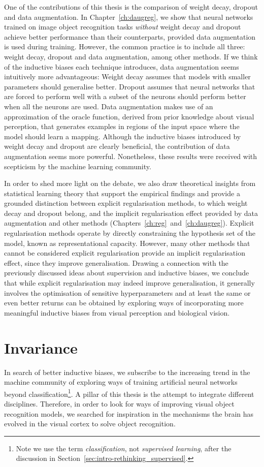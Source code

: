 {One of the contributions of this thesis is the comparison of weight decay, dropout and data augmentation. In Chapter~\ref{ch:daugreg}, we show that neural networks trained on image object recognition tasks \textit{without} weight decay and dropout achieve better performance than their counterparts, provided data augmentation is used during training. However, the common practice is to include all three: weight decay, dropout and data augmentation, among other methods. If we think of the inductive biases each technique introduces, data augmentation seems intuitively more advantageous: Weight decay assumes that models with smaller parameters should generalise better. Dropout assumes that neural networks that are forced to perform well with a subset of the neurons should perform better when all the neurons are used. Data augmentation makes use of an approximation of the oracle function, derived from prior knowledge about visual perception, that generates examples in regions of the input space where the model should learn a mapping. Although the inductive biases introduced by weight decay and dropout are clearly beneficial, the contribution of data augmentation seems more powerful. Nonetheless, these results were received with scepticism by the machine learning community.

In order to shed more light on the debate, we also draw theoretical insights from statistical learning theory that support the empirical findings and provide a grounded distinction between explicit regularisation methods, to which weight decay and dropout belong, and the implicit regularisation effect provided by data augmentation and other methods (Chapters~\ref{ch:reg}~and~\ref{ch:daugreg}). Explicit regularisation methods operate by directly constraining the hypothesis set of the model, known as representational capacity. However, many other methods that cannot be considered explicit regularisation provide an implicit regularisation effect, since they improve generalisation. Drawing a connection with the previously discussed ideas about supervision and inductive biases, we conclude that while explicit regularisation may indeed improve generalisation, it generally involves the optimisation of sensitive hyperparameters and at least the same or even better returns can be obtained by exploring ways of incorporating more meaningful inductive biases from visual perception and biological vision.

\section{Invariance}
In search of better inductive biases, we subscribe to the increasing trend in the machine community of exploring ways of training artificial neural networks beyond classification\footnote{Note we use the term \textit{classification}, not \textit{supervised learning}, after the discussion in Section~\ref{sec:intro-rethinking_supervised}.}. A pillar of this thesis is the attempt to integrate different disciplines. Therefore, in order to look for ways of improving visual object recognition models, we searched for inspiration in the mechanisms the brain has evolved in the visual cortex to solve object recognition.

}
